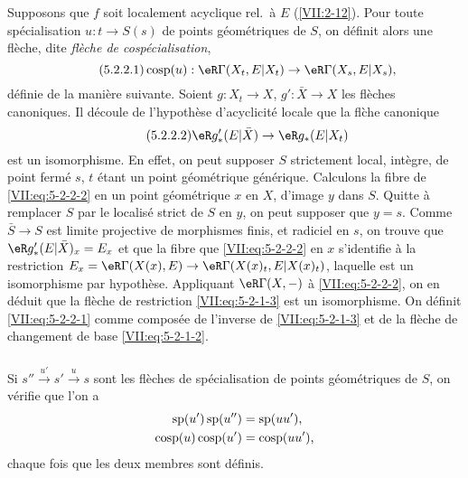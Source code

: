 \subsubsection{}\label{VII:5-2-2}

Supposons que $f$ soit localement acyclique rel.\ à $E$ (\ref{VII:2-12}). 
Pour toute spécialisation $u:t\to S(s)$ de points géométriques de $S$, on 
définit alors une flèche, dite \emph{flèche de cospécialisation}, 
\begin{equation*}\tag{5.2.2.1}\label{VII:eq:5-2-2-1}
  \cosp(u):\eR\Gamma(X_t,E|X_t) \to \eR\Gamma(X_s,E|X_s) \text{,} 
\end{equation*}
définie de la manière suivante. Soient $g:X_t\to X$, $g':\bar X\to X$ les 
flèches canoniques. Il découle de l'hypothèse d'acyclicité locale que 
la fl\`che canonique 
\begin{equation*}\tag{5.2.2.2}\label{VII:eq:5-2-2-2}
  \eR g_\ast'(E|\bar X)\to \eR g_\ast(E|X_t) 
\end{equation*}
est un isomorphisme. En effet, on peut supposer $S$ strictement local, 
intègre, de point fermé $s$, $t$ étant un point géométrique 
générique. Calculons la fibre de \eqref{VII:eq:5-2-2-2} en un point 
géométrique $x$ en $X$, d'image $y$ dans $S$. Quitte à remplacer $S$ par 
le localisé strict de $S$ en $y$, on peut supposer que $y=s$. Comme 
$\bar S\to S$ est limite projective de morphismes finis, et radiciel en $s$, on 
trouve que $\eR g_\ast'(E|\bar X)_x = E_x$ et que la fibre que 
\eqref{VII:eq:5-2-2-2} en $x$ s'identifie à la restriction 
$E_x=\eR\Gamma(X(x),E)\to \eR\Gamma(X(x)_t,E|X(x)_t)$, laquelle est un 
isomorphisme par hypothèse. Appliquant $\eR\Gamma(X,-)$ à 
\eqref{VII:eq:5-2-2-2}, on en déduit que la flèche de restriction 
\eqref{VII:eq:5-2-1-3} est un isomorphisme. On définit \eqref{VII:eq:5-2-2-1} 
comme composée de l'inverse de \eqref{VII:eq:5-2-1-3} et de la flèche de 
changement de base \eqref{VII:eq:5-2-1-2}. 





\subsubsection{}\label{VII:5-2-3}

Si $s'' \xrightarrow{u'} s' \xrightarrow u s$ sont les flèches de 
spécialisation de points géométriques de $S$, on vérifie que l'on a 
\begin{align*}
  \operatorname{sp}(u')\operatorname{sp}(u'') &= \operatorname{sp}(u u') \text{,} \\
  \operatorname{cosp}(u) \operatorname{cosp}(u') &= \operatorname{cosp}(u u') \text{,} 
\end{align*}
chaque fois que les deux membres sont définis. 





